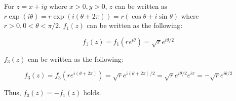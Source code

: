 \documentclass{scrartcl}
\begin{document}
For \(z = x + iy\) where \(x > 0, y > 0\), \(z\) can be written as \(r\exp(i\theta) = r\exp(i(\theta + 2\pi)) = r(\cos\theta + i\sin\theta)\) where \(r > 0, 0 < \theta < \pi / 2\).
\(f_1(z)\) can be written as the following:

\[
  f_1(z) = f_1(re^{i\theta}) = \sqrt{r}e^{i\theta / 2}
\]

\(f_3(z)\) can be written as the following:

\[
  f_3(z) = f_3(re^{i(\theta + 2\pi)}) = \sqrt{r}e^{i(\theta + 2\pi) / 2} = \sqrt{r}e^{i\theta / 2}e^{i\pi} = -\sqrt{r}e^{i\theta / 2}
\]

Thus, \(f_3(z) = -f_1(z)\) holds.
\end{document}
